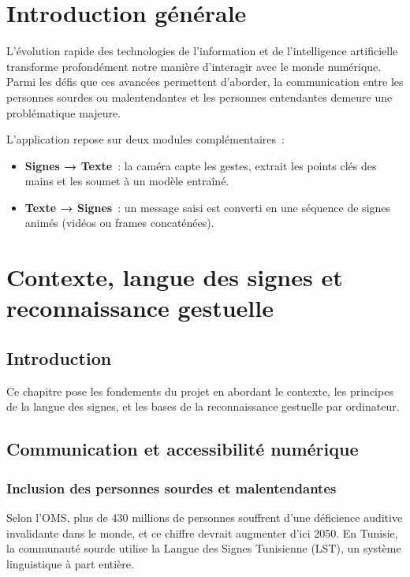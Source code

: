 \documentclass[12pt,fleqn,a4paper]{report}
\begin{document}
\adjustmtc

\chapter*{Introduction générale}
\lettrine{L}{}'évolution rapide des technologies de l'information et de l'intelligence artificielle transforme profondément notre manière d'interagir avec le monde numérique. Parmi les défis que ces avancées permettent d'aborder, la communication entre les personnes sourdes ou malentendantes et les personnes entendantes demeure une problématique majeure.

L'application repose sur deux modules complémentaires~:
\begin{itemize}[leftmargin=1.5cm]
  \item \textbf{Signes → Texte}~: la caméra capte les gestes, extrait les points clés des mains et les soumet à un modèle entraîné.
  \item \textbf{Texte → Signes}~: un message saisi est converti en une séquence de signes animés (vidéos ou frames concaténées).
\end{itemize}

\chapter{Contexte, langue des signes et reconnaissance gestuelle}
\minitoc
\newpage
\section{Introduction}
Ce chapitre pose les fondements du projet en abordant le contexte, les principes de la langue des signes, et les bases de la reconnaissance gestuelle par ordinateur.

\section{Communication et accessibilité numérique}
\subsection{Inclusion des personnes sourdes et malentendantes}
Selon l’OMS, plus de 430 millions de personnes souffrent d’une déficience auditive invalidante dans le monde, et ce chiffre devrait augmenter d’ici 2050. En Tunisie, la communauté sourde utilise la Langue des Signes Tunisienne (LST), un système linguistique à part entière.
\end{document}
